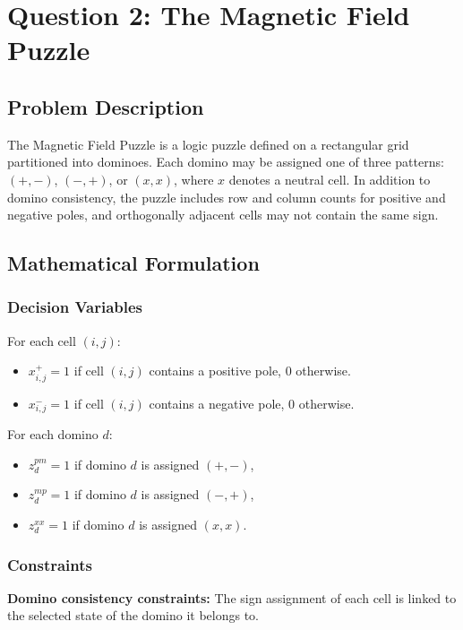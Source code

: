 \documentclass[11pt,a4paper]{article}
\begin{document}
\section*{Question 2: The Magnetic Field Puzzle}

\subsection*{Problem Description}

The Magnetic Field Puzzle is a logic puzzle defined on a rectangular grid partitioned into dominoes. Each domino may be assigned one of three patterns: $(+,-)$, $(-,+)$, or $(x,x)$, where $x$ denotes a neutral cell. In addition to domino consistency, the puzzle includes row and column counts for positive and negative poles, and orthogonally adjacent cells may not contain the same sign.

\subsection*{Mathematical Formulation}

\subsubsection*{Decision Variables}
For each cell $(i,j)$:
\begin{itemize}
    \item $x_{i,j}^{+}=1$ if cell $(i,j)$ contains a positive pole, $0$ otherwise.
    \item $x_{i,j}^{-}=1$ if cell $(i,j)$ contains a negative pole, $0$ otherwise.
\end{itemize}

For each domino $d$:
\begin{itemize}
    \item $z_d^{pm}=1$ if domino $d$ is assigned $(+,-)$,
    \item $z_d^{mp}=1$ if domino $d$ is assigned $(-,+)$,
    \item $z_d^{xx}=1$ if domino $d$ is assigned $(x,x)$.
\end{itemize}

\subsubsection*{Constraints}
\textbf{Domino consistency constraints:} The sign assignment of each cell is linked to the selected state of the domino it belongs to.
\end{document}
